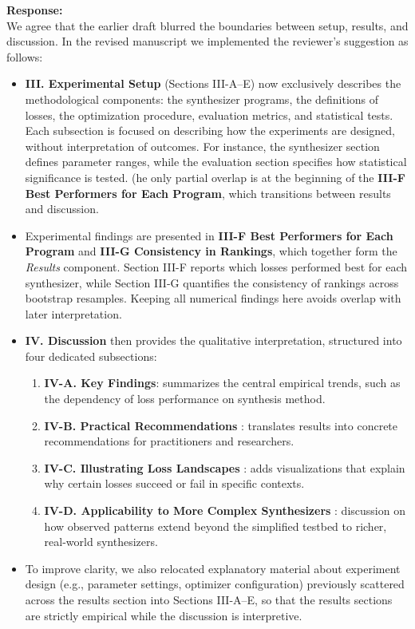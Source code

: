 \documentclass[11pt]{article}
\begin{document}
\noindent\textbf{Response:} \\
We agree that the earlier draft blurred the boundaries between setup, results, and discussion. In the revised manuscript we implemented the reviewer’s suggestion as follows:

\begin{itemize}
  \item \textbf{III. Experimental Setup} (Sections III-A–E) now exclusively describes the methodological components: the synthesizer programs, the definitions of losses, the optimization procedure, evaluation metrics, and statistical tests. Each subsection is focused on describing how the experiments are designed, without interpretation of outcomes. For instance, the synthesizer section defines parameter ranges, while the evaluation section specifies how statistical significance is tested.  (he only partial overlap is at the beginning of the \textbf{III-F Best Performers for Each Program}, which transitions between results and discussion.

  \item Experimental findings are presented in \textbf{III-F Best Performers for Each Program} and \textbf{III-G Consistency in Rankings}, which together form the \emph{Results} component. Section III-F reports which losses performed best for each synthesizer, while Section III-G quantifies the consistency of rankings across bootstrap resamples. Keeping all numerical findings here avoids overlap with later interpretation.  

  \item \textbf{IV. Discussion} then provides the qualitative interpretation, structured into four dedicated subsections:  
    \begin{enumerate}
      \item \textbf{IV-A. Key Findings}: summarizes the central empirical trends, such as the dependency of loss performance on synthesis method.  
      \item \textbf{IV-B. Practical Recommendations} : translates results into concrete recommendations for practitioners and researchers.  
      \item \textbf{IV-C. Illustrating Loss Landscapes} : adds visualizations that explain why certain losses succeed or fail in specific contexts.  
      \item \textbf{IV-D. Applicability to More Complex Synthesizers} : discussion on how observed patterns extend beyond the simplified testbed to richer, real-world synthesizers.  
    \end{enumerate}

  \item To improve clarity, we also relocated explanatory material about experiment design (e.g., parameter settings, optimizer configuration) previously scattered across the results section into Sections III-A–E, so that the results sections are strictly empirical while the discussion is interpretive.  
\end{itemize}
\end{document}
